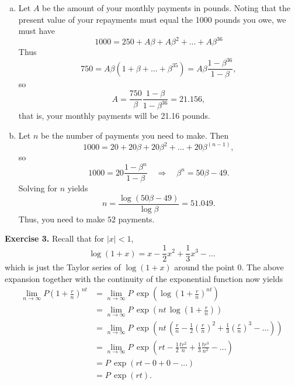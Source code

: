 \documentclass[11pt,a4paper]{report}
\begin{document}
    \begin{enumerate}[(a)]
        \item Let $A$ be the amount of your monthly payments in pounds. Noting that the present value of your repayments must equal the 1000 pounds you owe, we must have
        $$1000 = 250 +A\beta+A\beta^2+\ldots + A\beta^{36}$$
        Thus
        $$750 = A\beta(1+\beta+\ldots +\beta^{35}) = A\beta\frac{1-\beta^{36}}{1-\beta},$$
        so
        $$A = \frac{750}{\beta}\frac{1-\beta}{1-\beta^{36}} = 21.156,$$
        that is, your monthly payments will be 21.16 pounds.
        \item Let $n$ be the number of payments you need to make. Then
        $$1000 = 20 + 20\beta + 20\beta^2+\ldots + 20\beta^(n-1),$$
        so 
        $$1000=20\frac{1-\beta^n}{1-\beta}\quad \Rightarrow \quad \beta^n = 50\beta-49.$$
        Solving for $n$ yields
        $$n = \frac{\log(50\beta - 49)}{\log \beta}=51.049.$$
        Thus, you need to make $52$ payments.
    \end{enumerate}
    \textbf{Exercise 3.} Recall that for $|x| < 1$,
    $$\log(1+x) = x - \frac{1}{2}x^2+\frac{1}{3}x^3-\ldots$$
    which is just the Taylor series of $\log(1 + x)$ around the point $0$. The above expansion together with the continuity of the exponential function now yields
    \begin{align*}
        \lim_{n \to \infty}P\left(1+\frac{r}{n}\right)^{nt} & = \lim_{n\to \infty}P\, \exp\left(\log\left(1+\frac{r}{n}\right)^{nt}\right)\\
        &= \lim_{n\to \infty}P\, \exp\left(nt\,\log\left(1+\frac{r}{n}\right)\right)\\
        &= \lim_{n\to \infty}P\, \exp\left(nt\, \left(\frac{r}{n}-\frac{1}{2}\left(\frac{r}{n}\right)^2+\frac{1}{3}\left(\frac{r}{n}\right)^3-\ldots\right)\right)\\
        &=\lim_{n\to \infty}P\, \exp\left(rt-\frac{1}{2}\frac{tr^2}{n}+\frac{1}{3}\frac{tr^3}{n^2}-\ldots\right)\\
        &= P\, \exp(rt-0+0-\ldots)\\
        &= P\, \exp(rt).
    \end{align*}
\end{document}
